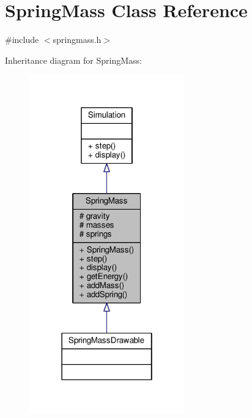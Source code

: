 \hypertarget{classSpringMass}{}\section{Spring\+Mass Class Reference}
\label{classSpringMass}


{\ttfamily \#include $<$springmass.\+h$>$}



Inheritance diagram for Spring\+Mass\+:
\nopagebreak
\begin{figure}[H]
\begin{center}
\leavevmode
\includegraphics[width=190pt]{classSpringMass__inherit__graph}
\end{center}
\end{figure}


